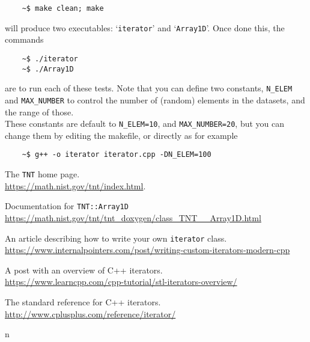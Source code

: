 \begin{verbatim}
    ~$ make clean; make
\end{verbatim}

will produce two executables: `{\tt iterator}' and `{\tt Array1D}'. Once done this, the commands

\begin{verbatim}
    ~$ ./iterator
    ~$ ./Array1D
\end{verbatim}

are to run each of these tests. Note that you can define two constants, {\tt N\_ELEM} and {\tt MAX\_NUMBER} to control the number of (random) elements in the datasets, and the range of those.
\\
These constants are default to {\tt N\_ELEM=10}, and {\tt MAX\_NUMBER=20}, but you can change them by editing the makefile, or directly as for example

\begin{verbatim}
    ~$ g++ -o iterator iterator.cpp -DN_ELEM=100
\end{verbatim}

\begin{thebibliography}{9}
The {\tt TNT} home page.
\\ \url{https://math.nist.gov/tnt/index.html}.

Documentation for {\tt TNT::Array1D} 
\\ \url{https://math.nist.gov/tnt/tnt_doxygen/class_TNT__Array1D.html}

An article describing how to write your own {\tt iterator} class.
\\ \url{https://www.internalpointers.com/post/writing-custom-iterators-modern-cpp}

A post with an overview of C++ iterators.
\\ \url{https://www.learncpp.com/cpp-tutorial/stl-iterators-overview/}

The standard reference for C++ iterators.
\\ \url{http://www.cplusplus.com/reference/iterator/}
\end{thebibliography}
n